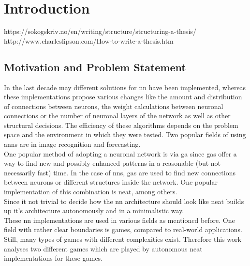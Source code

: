 %
\chapter{Introduction}
\label{sec:intro}



https://sokogskriv.no/en/writing/structure/structuring-a-thesis/
http://www.charleslipson.com/How-to-write-a-thesis.htm

\section{Motivation and Problem Statement}
\label{sec:intro:motivation}
In the last decade may different solutions for \gls{nn} have been implemented, whereas these implementations propose various changes like the amount and distribution of connections between neurons, the weight calculations between neuronal connections or the number of neuronal layers  of the network as well as other structural decisions. 
The efficiency of these algorithms depends on the problem space and the environment in which they were tested. Two popular fields of using \gls{ann}s are in image recognition and forecasting.\cite{khandelwal_time_2015, mehdy_artificial_2017}\\
One popular method of adopting a neuronal network is via \gls{ga} since \gls{ga}s offer a way to find new and possibly enhanced patterns in a reasonable (but not necessarily fast) time. In the case of \gls{nn}s, \gls{ga}s are used to find new connections between neurons or different structures inside the network. One popular implementation of this combination is \gls{neat}, among others.\cite{stanley_evolving_2002}  \\
Since it not trivial to decide how the \gls{nn} architecture should look like \gls{neat} builds up it's architecture autonomously and in a minimalistic way.\\
These \gls{nn} implementations are used in various fields as mentioned before. One field with rather clear boundaries is games, compared to real-world applications. Still, many types of games with different complexities exist\cite{risi_neuroevolution_2014}. Therefore this work analyses two different games which are played by autonomous \gls{neat} implementations for these games.\\
